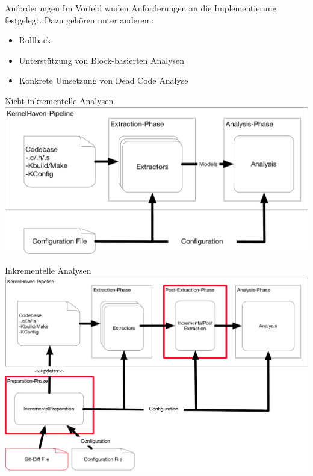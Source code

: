 \documentclass[aspectratio=43, noserifmath]{beamer}
\begin{document}
\begin{frame}{Anforderungen}
Im Vorfeld wuden Anforderungen an die Implementierung festgelegt.
Dazu geh\"oren unter anderem:
\begin{itemize}
	\item[\textbullet] Rollback
	\item[\textbullet] Unterst\"utzung von Block-basierten Analysen
	\item[\textbullet] Konkrete Umsetzung von Dead Code Analyse
\end{itemize}
\end{frame}



\begin{frame}{Nicht inkrementelle Analysen}
\includegraphics[width=1\textwidth]{image/KernelHaven.pdf}
\end{frame}


\begin{frame}{Inkrementelle Analysen}
\includegraphics[width=1\textwidth]{image/KernelHavenIncremental.pdf}
\end{frame}
\end{document}
